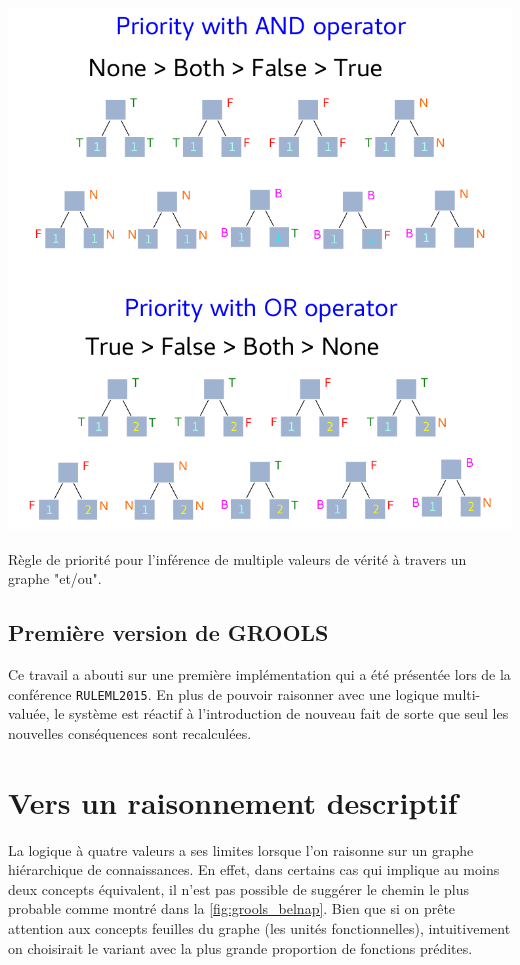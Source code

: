 \begin{refsegment}
\begin{shadedfigure}[H]
    \centering
    \includegraphics[width=\textwidth]{img/four_values_priorities_rules.pdf}
    \caption{ Règle de priorité pour l'inférence de multiple valeurs de vérité à travers un graphe "et/ou". }
    \label{fig:four_truth_values}
\end{shadedfigure}


\subsection{Première version de GROOLS}
Ce travail a abouti sur une première implémentation qui a été présentée lors de la conférence \texttt{RULEML2015}. En plus de pouvoir raisonner avec une logique multi-valuée, le système est réactif à l'introduction de nouveau fait de sorte que seul les nouvelles conséquences sont recalculées.



\section{Vers un raisonnement descriptif}

La logique à quatre valeurs a ses limites lorsque l'on raisonne sur un graphe hiérarchique de connaissances. En effet, dans certains cas qui implique au moins deux concepts équivalent, il n'est pas possible de suggérer le chemin le plus probable comme montré dans la \cref{fig:grools_belnap}. Bien que si on prête attention aux concepts feuilles du graphe (les unités fonctionnelles), intuitivement on choisirait le variant avec la plus grande proportion de fonctions prédites.


\end{refsegment}
